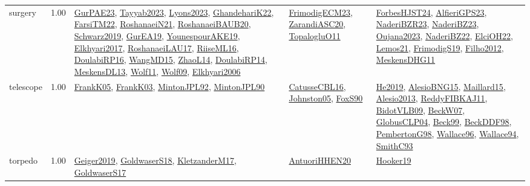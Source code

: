 {\begin{longtable}{p{3cm}r>{\raggedright\arraybackslash}p{6cm}>{\raggedright\arraybackslash}p{6cm}>{\raggedright\arraybackslash}p{8cm}}
\index{surgery}\index{ApplicationAreas!surgery}surgery &  1.00 & \hyperref[detail:GurPAE23]{GurPAE23}, \hyperref[detail:Tayyab2023]{Tayyab2023}, \hyperref[detail:Lyons2023]{Lyons2023}, \hyperref[detail:GhandehariK22]{GhandehariK22}, \hyperref[detail:FarsiTM22]{FarsiTM22}, \hyperref[detail:RoshanaeiN21]{RoshanaeiN21}, \hyperref[detail:RoshanaeiBAUB20]{RoshanaeiBAUB20}, \hyperref[detail:Schwarz2019]{Schwarz2019}, \hyperref[detail:GurEA19]{GurEA19}, \hyperref[detail:YounespourAKE19]{YounespourAKE19}, \hyperref[detail:Elkhyari2017]{Elkhyari2017}, \hyperref[detail:RoshanaeiLAU17]{RoshanaeiLAU17}, \hyperref[detail:RiiseML16]{RiiseML16}, \hyperref[detail:DoulabiRP16]{DoulabiRP16}, \hyperref[detail:WangMD15]{WangMD15}, \hyperref[detail:ZhaoL14]{ZhaoL14}, \hyperref[detail:DoulabiRP14]{DoulabiRP14}, \hyperref[detail:MeskensDL13]{MeskensDL13}, \hyperref[detail:Wolf11]{Wolf11}, \hyperref[detail:Wolf09]{Wolf09}, \hyperref[detail:Elkhyari2006]{Elkhyari2006} & \hyperref[detail:FrimodigECM23]{FrimodigECM23}, \hyperref[detail:ZarandiASC20]{ZarandiASC20}, \hyperref[detail:TopalogluO11]{TopalogluO11} & \hyperref[detail:ForbesHJST24]{ForbesHJST24}, \hyperref[detail:AlfieriGPS23]{AlfieriGPS23}, \hyperref[detail:NaderiBZR23]{NaderiBZR23}, \hyperref[detail:NaderiBZ23]{NaderiBZ23}, \hyperref[detail:Oujana2023]{Oujana2023}, \hyperref[detail:NaderiBZ22]{NaderiBZ22}, \hyperref[detail:ElciOH22]{ElciOH22}, \hyperref[detail:Lemos21]{Lemos21}, \hyperref[detail:FrimodigS19]{FrimodigS19}, \hyperref[detail:Filho2012]{Filho2012}, \hyperref[detail:MeskensDHG11]{MeskensDHG11}\\
\index{telescope}\index{ApplicationAreas!telescope}telescope &  1.00 & \hyperref[detail:FrankK05]{FrankK05}, \hyperref[detail:FrankK03]{FrankK03}, \hyperref[detail:MintonJPL92]{MintonJPL92}, \hyperref[detail:MintonJPL90]{MintonJPL90} & \hyperref[detail:CatusseCBL16]{CatusseCBL16}, \hyperref[detail:Johnston05]{Johnston05}, \hyperref[detail:FoxS90]{FoxS90} & \hyperref[detail:He2019]{He2019}, \hyperref[detail:AlesioBNG15]{AlesioBNG15}, \hyperref[detail:Maillard15]{Maillard15}, \hyperref[detail:Alesio2013]{Alesio2013}, \hyperref[detail:ReddyFIBKAJ11]{ReddyFIBKAJ11}, \hyperref[detail:BidotVLB09]{BidotVLB09}, \hyperref[detail:BeckW07]{BeckW07}, \hyperref[detail:GlobusCLP04]{GlobusCLP04}, \hyperref[detail:Beck99]{Beck99}, \hyperref[detail:BeckDDF98]{BeckDDF98}, \hyperref[detail:PembertonG98]{PembertonG98}, \hyperref[detail:Wallace96]{Wallace96}, \hyperref[detail:Wallace94]{Wallace94}, \hyperref[detail:SmithC93]{SmithC93}\\
\index{torpedo}\index{ApplicationAreas!torpedo}torpedo &  1.00 & \hyperref[detail:Geiger2019]{Geiger2019}, \hyperref[detail:GoldwaserS18]{GoldwaserS18}, \hyperref[detail:KletzanderM17]{KletzanderM17}, \hyperref[detail:GoldwaserS17]{GoldwaserS17} & \hyperref[detail:AntuoriHHEN20]{AntuoriHHEN20} & \hyperref[detail:Hooker19]{Hooker19}\\

\end{longtable}}
